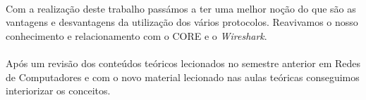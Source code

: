 \documentclass[runningheads]{llncs}
\begin{document}
    \paragraph{}
    Com a realização deste trabalho passámos a ter uma melhor noção do que são as vantagens e desvantagens da utilização dos vários protocolos. Reavivamos o nosso conhecimento e relacionamento com o CORE e o \textit{Wireshark}.
    \paragraph{}
    Após um revisão dos conteúdos teóricos lecionados no semestre anterior em Redes de Computadores e com o novo material lecionado nas aulas teóricas conseguimos interiorizar os conceitos.
\end{document}
